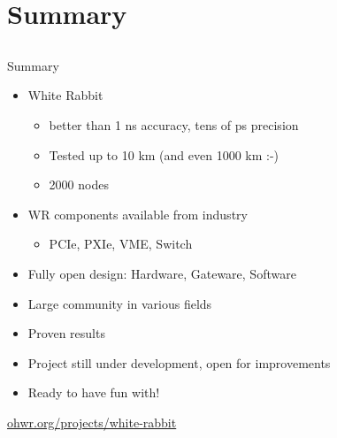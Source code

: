 \documentclass[compress,red]{beamer}
\begin{document}
\section{Summary}
\subsection{}
\begin{frame}{Summary}


    \begin{itemize}
      \item White Rabbit
      \begin{itemize}
	\item better than 1 ns accuracy, tens of ps precision
	\item Tested up to 10 km (and even 1000 km :-)
	\item 2000 nodes
      \end{itemize}
      \item WR components available from industry
      \begin{itemize}
	\item PCIe, PXIe, VME, Switch
      \end{itemize}
      \item Fully open design: Hardware, Gateware, Software
      \item Large community in various fields
      \item Proven results
      \item Project still under development, open for improvements
      \item Ready to have fun with!
    \end{itemize}    

\begin{center}
\href{http://ohwr.org/projects/white-rabbit}{ohwr.org/projects/white-rabbit}
\end{center}

 
\end{frame}
\end{document}
